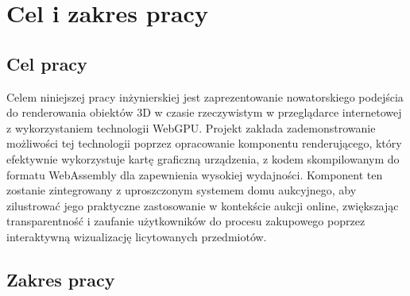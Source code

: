 \section{Cel i zakres pracy}

\subsection{Cel pracy}

Celem niniejszej pracy inżynierskiej jest zaprezentowanie nowatorskiego podejścia do renderowania obiektów 3D w czasie rzeczywistym w przeglądarce internetowej z wykorzystaniem technologii WebGPU. Projekt zakłada zademonstrowanie możliwości tej technologii poprzez opracowanie komponentu renderującego, który efektywnie wykorzystuje kartę graficzną urządzenia, z kodem skompilowanym do formatu WebAssembly dla zapewnienia wysokiej wydajności. Komponent ten zostanie zintegrowany z uproszczonym systemem domu aukcyjnego, aby zilustrować jego praktyczne zastosowanie w kontekście aukcji online, zwiększając transparentność i zaufanie użytkowników do procesu zakupowego poprzez interaktywną wizualizację licytowanych przedmiotów.

\subsection{Zakres pracy}

